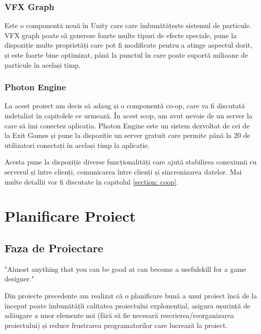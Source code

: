 \documentclass[12pt, a4paper]{article}
\begin{document}
	
	
	
	
	\subsubsection{VFX Graph}
	
	Este o componentă nouă în Unity care care îmbunătățește sistemul de particule. VFX graph poate să genereze foarte multe tipuri de efecte speciale, pune la dispoziție multe proprietăți care pot fi modificate pentru a atinge aspectul dorit, și este foarte bine optimizat, până la punctul în care poate suportă milioane de particule în același timp.
	
	
	
	
	
	\subsubsection{Photon Engine}
	
	La acest proiect am decis să adaug și o componentă co-op, care va fi discutată indetaliat în capitolele ce urmează. În acest scop, am avut nevoie de un server la care să îmi conectez aplicația. Photon Engine este un sistem dezvoltat de cei de la Exit Games și pune la dispoziție un server gratuit care permite până la 20 de utilizatori conectați în același timp la aplicație.
	\newline
	
	Acesta pune la dispoziție diverse funcționalități care ajută stabilirea conexiunii cu serverul și între clienți, comunicarea între clienți și sincronizarea datelor. Mai multe detallii vor fi discutate în capitolul \ref{section: coop}.
	
	
	
	
	
	\section{Planificare Proiect}

	\subsection{Faza de Proiectare}
	
	"Almost anything that you can be good at can become a usefulskill for a game designer." \cite{bookOfLenses}
	\newline
	
	Din proiecte precedente am realizat că o planificare bună a unui proiect încă de la început poate îmbunătățîi calitatea proiectului explonential, asigura ușurință de adăugare a unor elemente noi (fără să fie necesară rescrierea/reorganizarea proiectului) și reduce frustrarea programatorilor care lucrează la proiect.
	\newline
	
\end{document}
